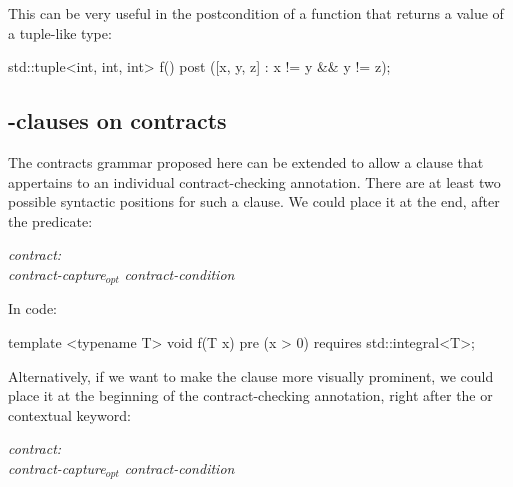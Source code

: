 This can be very useful in the postcondition of a function that returns a value of a tuple-like type:

\begin{codeblock}
std::tuple<int, int, int> f()
  post ([x, y, z] : x != y && y != z);
\end{codeblock}



\subsection{-clauses on contracts}
\label{subsec:requires}

The contracts grammar proposed here can be extended to allow a  clause that appertains to an individual contract-checking annotation. There are at least two possible syntactic positions for such a  clause. We could place it at the end, after the predicate:

\begin{adjustwidth}{0.5cm}{0.5cm}
\emph{contract:} \\
\phantom{~~~}\emph{contract-capture}$_{opt}$ \emph{contract-condition} 

\end{adjustwidth}

In code:

\begin{codeblock}
template <typename T>
void f(T x)
  pre (x > 0) requires std::integral<T>;
\end{codeblock}

Alternatively, if we want to make the  clause more visually prominent, we could place it at the beginning of the contract-checking annotation, right after the  or  contextual keyword:

\begin{adjustwidth}{0.5cm}{0.5cm}

\emph{contract:} \\
\phantom{~~~} \emph{contract-capture}$_{opt}$ \emph{contract-condition}

\end{adjustwidth}

